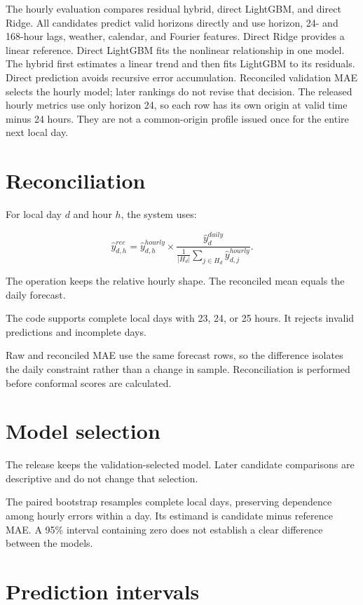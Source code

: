 \documentclass[10.5pt,a4paper]{article}
\begin{document}
The hourly evaluation compares residual hybrid, direct LightGBM, and direct Ridge. All candidates
predict valid horizons directly and use horizon, 24- and 168-hour lags, weather, calendar, and
Fourier features. Direct Ridge provides a linear reference. Direct LightGBM fits the nonlinear
relationship in one model. The hybrid first estimates a linear trend and then fits LightGBM to its
residuals. Direct prediction avoids recursive error accumulation. Reconciled validation MAE selects
the hourly model; later rankings do not revise that decision. The released hourly metrics use only
horizon 24, so each row has its own origin at valid time minus 24 hours. They are not a common-origin
profile issued once for the entire next local day.

\section{Reconciliation}

For local day $d$ and hour $h$, the system uses:

\[
\hat{y}^{rec}_{d,h}
=
\hat{y}^{hourly}_{d,h}
\times
\frac{\hat{y}^{daily}_{d}}
{\frac{1}{|H_d|}\sum_{j\in H_d}\hat{y}^{hourly}_{d,j}}.
\]

The operation keeps the relative hourly shape. The reconciled mean equals the
daily forecast.

The code supports complete local days with 23, 24, or 25 hours. It rejects
invalid predictions and incomplete days.

Raw and reconciled MAE use the same forecast rows, so the difference isolates the daily constraint
rather than a change in sample. Reconciliation is performed before conformal scores are calculated.

\section{Model selection}

The release keeps the validation-selected model. Later candidate comparisons are descriptive and do
not change that selection.

The paired bootstrap resamples complete local days, preserving dependence among hourly errors within
a day. Its estimand is candidate minus reference MAE. A 95\% interval containing zero does not
establish a clear difference between the models.

\section{Prediction intervals}
\end{document}
